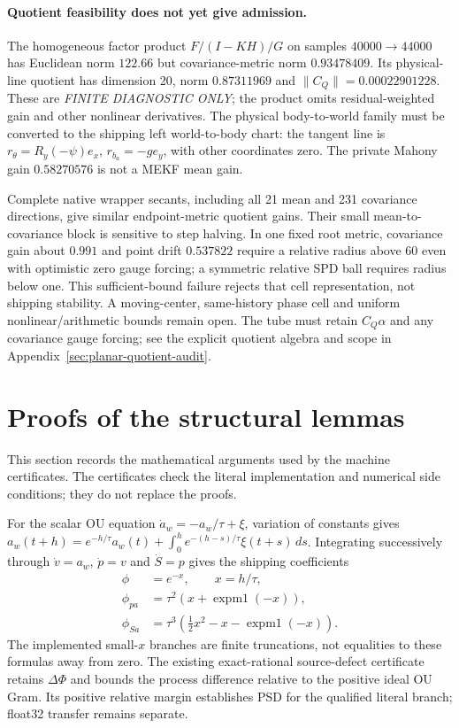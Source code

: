 \documentclass[journal]{IEEEtran}
\begin{document}
\paragraph{Quotient feasibility does not yet give admission.}
The homogeneous factor product $F/(I-KH)/G$ on samples $40000\to44000$
has Euclidean norm $122.66$ but covariance-metric norm $0.93478409$.
Its physical-line quotient has dimension 20, norm $0.87311969$ and
$\|C_Q\|=0.00022901228$. These are \emph{FINITE DIAGNOSTIC ONLY};
the product omits residual-weighted gain and other nonlinear derivatives.
The physical body-to-world family must be converted to the shipping left
world-to-body chart: the tangent line is
$r_\theta=R_y(-\psi)e_x$, $r_{b_a}=-g e_y$, with other coordinates zero.
The private Mahony gain $0.58270576$ is not a MEKF mean gain.

Complete native wrapper secants, including all 21 mean and 231 covariance
directions, give similar endpoint-metric quotient gains. Their small
mean-to-covariance block is sensitive to step halving. In one fixed root
metric, covariance gain about $0.991$ and point drift $0.537822$ require a
relative radius above 60 even with optimistic zero gauge forcing; a symmetric
relative SPD ball requires radius below one. This sufficient-bound failure
rejects that cell representation, not shipping stability. A moving-center,
same-history phase cell and uniform nonlinear/arithmetic bounds remain open.
The tube must retain $C_Q\alpha$ and any covariance gauge forcing; see the
explicit quotient algebra and scope in Appendix~\ref{sec:planar-quotient-audit}.

\section{Proofs of the structural lemmas}
This section records the mathematical arguments used by the machine
certificates.  The certificates check the literal implementation and numerical
side conditions; they do not replace the proofs.

\begin{proposition}
For the scalar OU equation $\dot a_w=-a_w/\tau+\xi$, variation of constants
gives $a_w(t+h)=e^{-h/\tau}a_w(t)+\int_0^h e^{-(h-s)/\tau}\xi(t+s)\,ds$.
Integrating successively through $\dot v=a_w$, $\dot p=v$ and $\dot S=p$
gives the shipping coefficients
\[
\begin{aligned}
 \phi&=e^{-x},\qquad x=h/\tau,\\
 \phi_{pa}&=\tau^2(x+\operatorname{expm1}(-x)),\\
 \phi_{Sa}&=\tau^3\!\left(\tfrac12x^2-x-\operatorname{expm1}(-x)\right).
\end{aligned}
\]
The implemented small-$x$ branches are finite truncations, not equalities
to these formulas away from zero. The existing exact-rational source-defect
certificate retains $\Delta\Phi$ and bounds the process difference relative
to the positive ideal OU Gram. Its positive relative margin establishes PSD
for the qualified literal branch; float32 transfer remains separate.
\end{proposition}
\end{document}
